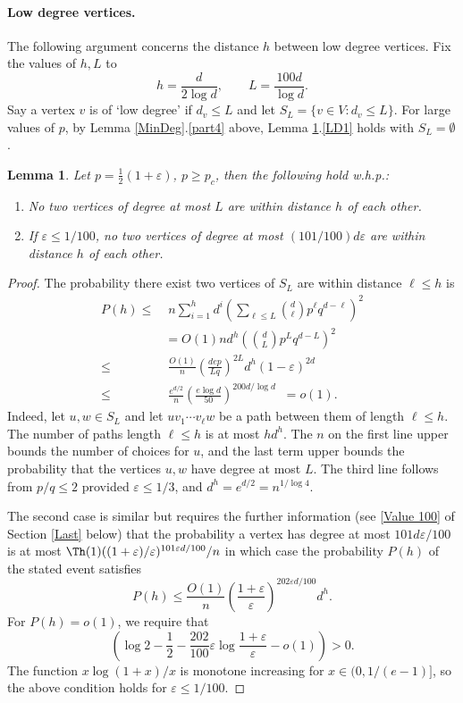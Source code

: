 \documentclass[12pt]{article}
\def\e{\varepsilon} \def\f{\phi} \def\F{{\Phi}} \def\vp{\varphi} \def\g{\gamma}
\newtheorem{lemma}[theorem]{Lemma}
\newcommand{\brac}[1]{\left(#1\right)}
\newcommand{\sfrac}[2]{\frac{\scriptstyle #1}{\scriptstyle #2}}
\newcommand{\bfrac}[2]{\left(\frac{#1}{#2}\right)}
\def\half{\sfrac{1}{2}}
\def\es{\emptyset}
\begin{document}
\paragraph{Low degree vertices.}
The following argument concerns the distance $h$ between low degree vertices.  Fix the values of $h,L$ to
\begin{equation}\nonumber
	h= \frac{d}{2 \log d}, \qquad L=  \frac{100 d}{\log d}.
\end{equation}
Say a vertex $v$ is of \lq low degree' if $d_v \le L$  and let $S_L=\{v \in V: d_v \le L\}$.
For large values of $p$,  by Lemma \ref{MinDeg}.\ref{part4} above,  Lemma \ref{LowDeg}.\ref{LD1} holds with $S_L=\es$. \begin{lemma}\label{LowDeg}
Let  $p=\half(1+\e)$, $ p\ge p_c$, then the following hold w.h.p.:
\begin{enumerate}
\item \label{LD1}
No two vertices of degree at most $L$ are within distance $h$ of each other.
\item \label{LD2} If $\e \le 1/100$,
no two vertices of degree at most $(101/100) d \e$ are within distance $h$ of each other.
\end{enumerate}
\end{lemma}
\begin{proof}
The probability there exist two vertices of $S_L$ are within distance  $\ell \le h$ is
\begin{align*}
P(h) \le & \; n\sum_{i=1}^hd^i \brac{\sum_{\ell\leq L}\binom{d}{\ell}p^\ell q^{d-\ell}}^2\\
&=O(1) nd^h \brac{\binom{d}{L}p^Lq^{d-L}}^2\\
\le& \; \frac{O(1)}{n} \bfrac{dep}{Lq}^{2L} d^h(1-\e)^{2d}\\
\le&\;  \frac{e^{d/2}}{n} \bfrac{e \log d}{50}^{200d/\log d}\;\;
=o(1).
\end{align*}
Indeed, let $u,w \in S_L$  and let $uv_1\cdots v_\ell w$ be a path between them of length $\ell \le h$. The number of  paths length $\ell \le h$ is at most $ hd^h$. The $n$ on the first line upper bounds the number of choices for  $u$, and the last term upper bounds the probability that the vertices $u,w$ have degree at most $L$.
The third line follows from $p/q\le 2$ provided $\e \le 1/3 $, and $d^h=e^{d/2}=n^{1/\log 4}$.


The second case is similar but  requires the further information (see \eqref{Value 100} of Section \ref{Last} below) that the probability a vertex has degree  at most $101 d \e/100$ is at most $\Th(1) ((1+\e)/\e)^{101\e d/100}/n$ in which case the probability $P(h)$ of the stated event  satisfies
\[
P(h)\le  \frac{O(1)}{n} \bfrac{1+\e}{\e}^{202 \e d/100} d^h.
\]
For   $P(h)=o(1)$, we require that
\[
\brac{\log 2-\frac 12 -\frac{202}{100}\e \log \frac{1+\e}{\e}-o(1)} > 0.
\]
The function $x \log (1+x)/x$ is  monotone increasing for $x \in (0,1/(e-1)]$,
so the above condition holds for $\e \le 1/100$.
\end{proof}
\end{document}
